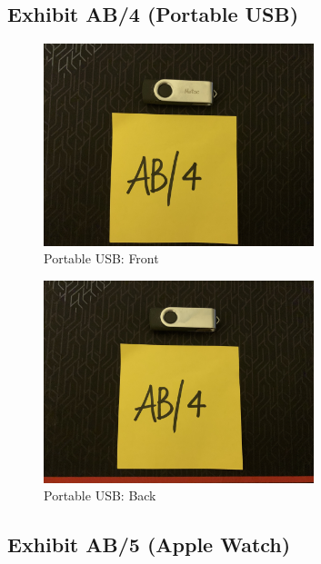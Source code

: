 \subsection{Exhibit AB/4 (Portable USB)}
\label{s:ab4}

\begin{figure}[h]
  \centering
  \includegraphics[width=0.7\textwidth]{figures/pictures/IMG_5049.JPG}
  \caption{Portable USB: Front}
  \label{fig:usb-front}
\end{figure}

\begin{figure}[h]
  \centering
  \includegraphics[width=0.7\textwidth]{figures/pictures/IMG_5050.JPG}
  \caption{Portable USB: Back}
  \label{fig:usb-back}
\end{figure}
\newpage

\subsection{Exhibit AB/5 (Apple Watch)}
\label{s:ab5}

